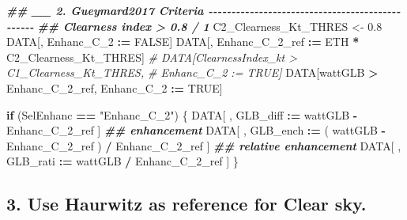 \documentclass[
  10pt,
  a4paper,oneside]{article}
\newenvironment{Shaded}{\begin{snugshade}}{\end{snugshade}}
\newcommand{\CommentTok}[1]{\textcolor[rgb]{0.56,0.35,0.01}{\textit{#1}}}
\newcommand{\ConstantTok}[1]{\textcolor[rgb]{0.56,0.35,0.01}{#1}}
\newcommand{\ControlFlowTok}[1]{\textcolor[rgb]{0.13,0.29,0.53}{\textbf{#1}}}
\newcommand{\DocumentationTok}[1]{\textcolor[rgb]{0.56,0.35,0.01}{\textbf{\textit{#1}}}}
\newcommand{\FloatTok}[1]{\textcolor[rgb]{0.00,0.00,0.81}{#1}}
\newcommand{\NormalTok}[1]{#1}
\newcommand{\OtherTok}[1]{\textcolor[rgb]{0.56,0.35,0.01}{#1}}
\newcommand{\SpecialCharTok}[1]{\textcolor[rgb]{0.81,0.36,0.00}{\textbf{#1}}}
\newcommand{\StringTok}[1]{\textcolor[rgb]{0.31,0.60,0.02}{#1}}
\begin{document}
\begin{Shaded}
\begin{Highlighting}[]
\DocumentationTok{\#\# \_\_ 2. Gueymard2017 Criteria  {-}{-}{-}{-}{-}{-}{-}{-}{-}{-}{-}{-}{-}{-}{-}{-}{-}{-}{-}{-}{-}{-}{-}{-}{-}{-}{-}{-}{-}{-}{-}{-}{-}{-}{-}{-}{-}{-}{-}{-}{-}{-}{-}{-}{-}{-}{-}{-}}
\DocumentationTok{\#\# Clearness index \textgreater{} 0.8 / 1}
\NormalTok{C2\_Clearness\_Kt\_THRES }\OtherTok{\textless{}{-}} \FloatTok{0.8}
\NormalTok{DATA[, Enhanc\_C\_2 }\SpecialCharTok{:=} \ConstantTok{FALSE}\NormalTok{]}
\NormalTok{DATA[, Enhanc\_C\_2\_ref }\SpecialCharTok{:=}\NormalTok{ ETH }\SpecialCharTok{*}\NormalTok{ C2\_Clearness\_Kt\_THRES]}
\CommentTok{\# DATA[ClearnessIndex\_kt \textgreater{} C1\_Clearness\_Kt\_THRES,}
\CommentTok{\#      Enhanc\_C\_2 := TRUE]}
\NormalTok{DATA[wattGLB }\SpecialCharTok{\textgreater{}}\NormalTok{ Enhanc\_C\_2\_ref,}
\NormalTok{     Enhanc\_C\_2 }\SpecialCharTok{:=} \ConstantTok{TRUE}\NormalTok{]}

\ControlFlowTok{if}\NormalTok{ (SelEnhanc }\SpecialCharTok{==} \StringTok{"Enhanc\_C\_2"}\NormalTok{) \{}
\NormalTok{  DATA[ , GLB\_diff }\SpecialCharTok{:=}\NormalTok{   wattGLB }\SpecialCharTok{{-}}\NormalTok{ Enhanc\_C\_2\_ref                    ] }\DocumentationTok{\#\# enhancement}
\NormalTok{  DATA[ , GLB\_ench }\SpecialCharTok{:=}\NormalTok{ ( wattGLB }\SpecialCharTok{{-}}\NormalTok{ Enhanc\_C\_2\_ref ) }\SpecialCharTok{/}\NormalTok{ Enhanc\_C\_2\_ref ] }\DocumentationTok{\#\# relative enhancement}
\NormalTok{  DATA[ , GLB\_rati }\SpecialCharTok{:=}\NormalTok{   wattGLB }\SpecialCharTok{/}\NormalTok{ Enhanc\_C\_2\_ref                    ]}
\NormalTok{\}}
\end{Highlighting}
\end{Shaded}

\hypertarget{use-haurwitz-as-reference-for-clear-sky.}{%
\subsection{3. Use Haurwitz as reference for Clear sky.}\label{use-haurwitz-as-reference-for-clear-sky.}}
\end{document}
